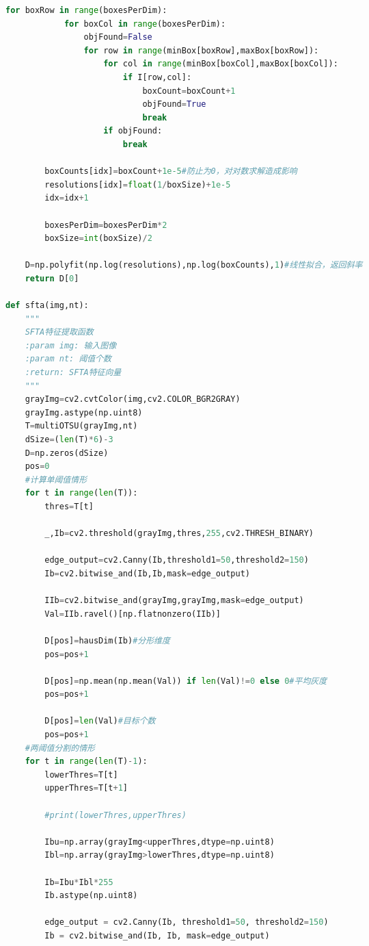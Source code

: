 \documentclass[supercite]{HustGraduPaper}
\begin{document}
\begin{sloppypar}
\begin{appendices}
\begin{spacing}{1.25}
\begin{lstlisting}[language=python]
        for boxRow in range(boxesPerDim):
            for boxCol in range(boxesPerDim):
                objFound=False
                for row in range(minBox[boxRow],maxBox[boxRow]):
                    for col in range(minBox[boxCol],maxBox[boxCol]):
                        if I[row,col]:
                            boxCount=boxCount+1
                            objFound=True
                            break
                    if objFound:
                        break

        boxCounts[idx]=boxCount+1e-5#防止为0，对对数求解造成影响
        resolutions[idx]=float(1/boxSize)+1e-5
        idx=idx+1

        boxesPerDim=boxesPerDim*2
        boxSize=int(boxSize)/2

    D=np.polyfit(np.log(resolutions),np.log(boxCounts),1)#线性拟合，返回斜率
    return D[0]

def sfta(img,nt):
    """
    SFTA特征提取函数
    :param img: 输入图像
    :param nt: 阈值个数
    :return: SFTA特征向量
    """
    grayImg=cv2.cvtColor(img,cv2.COLOR_BGR2GRAY)
    grayImg.astype(np.uint8)
    T=multiOTSU(grayImg,nt)
    dSize=(len(T)*6)-3
    D=np.zeros(dSize)
    pos=0
    #计算单阈值情形
    for t in range(len(T)):
        thres=T[t]

        _,Ib=cv2.threshold(grayImg,thres,255,cv2.THRESH_BINARY)

        edge_output=cv2.Canny(Ib,threshold1=50,threshold2=150)
        Ib=cv2.bitwise_and(Ib,Ib,mask=edge_output)

        IIb=cv2.bitwise_and(grayImg,grayImg,mask=edge_output)
        Val=IIb.ravel()[np.flatnonzero(IIb)]

        D[pos]=hausDim(Ib)#分形维度
        pos=pos+1

        D[pos]=np.mean(np.mean(Val)) if len(Val)!=0 else 0#平均灰度
        pos=pos+1

        D[pos]=len(Val)#目标个数
        pos=pos+1
    #两阈值分割的情形
    for t in range(len(T)-1):
        lowerThres=T[t]
        upperThres=T[t+1]

        #print(lowerThres,upperThres)

        Ibu=np.array(grayImg<upperThres,dtype=np.uint8)
        Ibl=np.array(grayImg>lowerThres,dtype=np.uint8)

        Ib=Ibu*Ibl*255
        Ib.astype(np.uint8)

        edge_output = cv2.Canny(Ib, threshold1=50, threshold2=150)
        Ib = cv2.bitwise_and(Ib, Ib, mask=edge_output)


\end{lstlisting}
\end{spacing}
\end{appendices}
\end{sloppypar}
\end{document}
